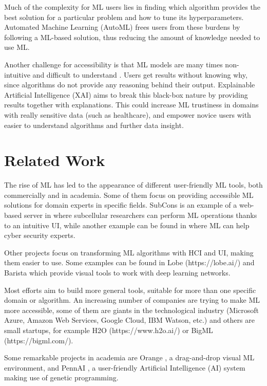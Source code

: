 \documentclass[runningheads]{llncs}
\begin{document}
	Much of the complexity for ML users lies in finding which algorithm provides the best solution for a
	particular problem and how to tune its hyperparameters. Automated Machine Learning (AutoML) frees users
	from these burdens \cite{automl} by following a ML-based solution, thus reducing the amount of knowledge needed to use ML.
	
	Another challenge for accessibility is that ML models are many times non-intuitive and difficult to understand \cite{xai}.
	 Users get results without knowing why, since algorithms do not provide
	any reasoning behind their output. Explainable Artificial Intelligence (XAI) aims to break this
	black-box nature by providing results together with explanations. 
	This could increase ML trustiness in domains with really sensitive data (such as healthcare),
	 and empower novice users with easier to understand algorithms and further data insight.
	
	\section{Related Work}
	
	The rise of ML has led to the appearance of different user-friendly ML tools, both commercially and in
	academia. Some of them focus on providing accessible ML solutions for domain experts in
	specific fields. SubCons \cite{subcons} is an example of a web-based server in where subcellular
	researchers can perform ML operations thanks to an intuitive UI, while another example can be found
	in \cite{cyber} where ML can help cyber security experts.
	
	Other projects focus on transforming ML algorithms with HCI and UI, making them easier to use.
	 Some examples can be found in Lobe (https://lobe.ai/) and Barista \cite{Barista} which provide visual tools to work with deep learning networks.
	
	Most efforts aim to build more general tools, suitable for more than one specific domain or algorithm.
	An increasing number of companies are trying to make ML more accessible, some of them are giants in the
	technological industry (Microsoft Azure, Amazon Web Services, Google Cloud, IBM Watson, etc.) and
	others are small startups, for example H2O (https://www.h2o.ai/) or BigML (https://bigml.com/).
	
	Some remarkable projects in academia are Orange \cite{orange}, a drag-and-drop visual ML environment,
	and PennAI \cite{pennAI}, a user-friendly Artificial Intelligence (AI) system making use of genetic
	programming.
	
\end{document}
